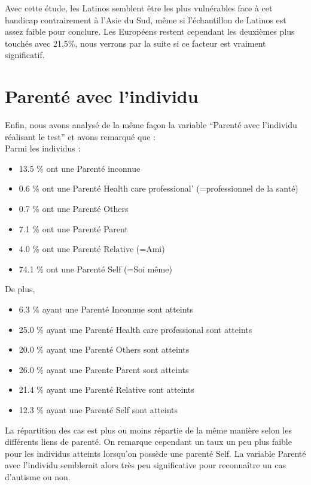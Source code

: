 \documentclass[12,french]{report}
\begin{document}
Avec cette étude, les Latinos semblent être les plus vulnérables face à cet handicap contrairement à l’Asie du Sud, même si l’échantillon de Latinos est assez faible pour conclure. Les Européens restent cependant les deuxièmes plus touchés avec 21,5\%, nous verrons par la suite si ce facteur est vraiment significatif.

\section{Parenté avec l'individu}
	Enfin, nous avons analysé de la même façon la variable “Parenté avec l’individu réalisant le test” et avons remarqué que :\\
	
	Parmi les individus :
\begin{itemize}[label=\textbullet]
	\item 13.5 \% ont une Parenté  inconnue 
	\item 0.6 \% ont une Parenté  Health care professional' (=professionnel 		de la santé)
	\item 0.7 \% ont une Parenté  Others
	\item 7.1 \% ont une Parenté  Parent
	\item 4.0 \% ont une Parenté  Relative (=Ami)
	\item 74.1 \% ont une Parenté  Self (=Soi même)
\end{itemize}\vspace{0.3cm}

\pagebreak

	De plus,
\begin{itemize}
	\item 6.3 \% ayant une Parenté Inconnue  sont atteints
	\item 25.0 \% ayant une Parenté  Health care professional  sont atteints
	\item 20.0 \% ayant une Parenté  Others  sont atteints
	\item 26.0 \% ayant une Parente  Parent  sont atteints
	\item 21.4 \% ayant une Parenté  Relative  sont atteints
	\item 12.3 \% ayant une Parenté  Self  sont atteints
\end{itemize}\vspace{0.3cm}

	La répartition des cas est plus ou moins répartie de la même manière selon les différents liens de parenté. On remarque cependant un taux un peu plus faible pour les individus atteints lorsqu’on possède une parenté Self. La variable Parenté avec l'individu semblerait alors très peu significative pour reconnaître un cas d’autisme ou non.
\end{document}
